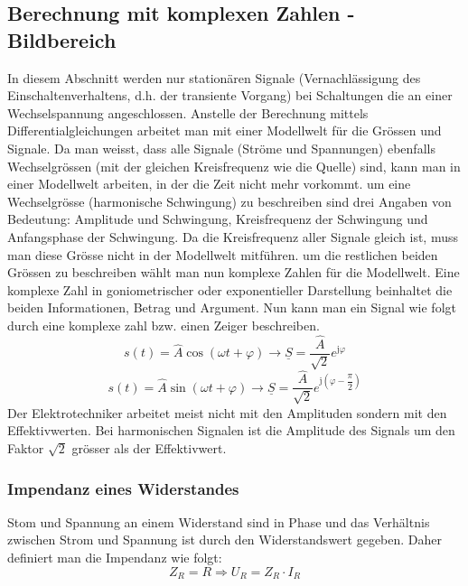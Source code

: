\subsection{Berechnung mit komplexen Zahlen - Bildbereich}
In diesem Abschnitt werden nur stationären Signale (Vernachlässigung des Einschaltenverhaltens, d.h. der transiente Vorgang) bei Schaltungen die an einer Wechselspannung angeschlossen. Anstelle der Berechnung mittels Differentialgleichungen arbeitet man mit einer Modellwelt für die Grössen und Signale. Da man weisst, dass alle Signale (Ströme und Spannungen) ebenfalls Wechselgrössen (mit der gleichen Kreisfrequenz wie die Quelle) sind, kann man in einer Modellwelt arbeiten, in der die Zeit nicht mehr vorkommt. um eine Wechselgrösse (harmonische Schwingung) zu beschreiben sind drei Angaben von Bedeutung: Amplitude und Schwingung, Kreisfrequenz der Schwingung und Anfangsphase der Schwingung.
\newline\newline
Da die Kreisfrequenz aller Signale gleich ist, muss man diese Grösse nicht in der Modellwelt mitführen. um die restlichen beiden Grössen zu beschreiben wählt man nun komplexe Zahlen für die Modellwelt. Eine komplexe Zahl in goniometrischer oder exponentieller Darstellung beinhaltet die beiden Informationen, Betrag und Argument. Nun kann man ein Signal wie folgt durch eine komplexe zahl bzw. einen Zeiger beschreiben.
\begin{equation}
\boxed{s\left(t\right)=\hat{A}\cos\left(\omega t+\varphi\right) \rightarrow \underline{S}=\dfrac{\hat{A}}{\sqrt{2}}e^{\text{j}\varphi}}
\end{equation}
\begin{equation}
\boxed{s\left(t\right)=\hat{A}\sin\left(\omega t+\varphi\right) \rightarrow \underline{S}=\dfrac{\hat{A}}{\sqrt{2}}e^{\text{j}\left(\varphi-\dfrac{\pi}{2}\right)}}
\end{equation}
Der Elektrotechniker arbeitet meist nicht mit den Amplituden sondern mit den Effektivwerten. Bei harmonischen Signalen ist die Amplitude des Signals um den Faktor $\sqrt{2}$ grösser als der Effektivwert.
\subsubsection{Impendanz eines Widerstandes}
Stom und Spannung an einem Widerstand sind in Phase und das Verhältnis zwischen Strom und Spannung ist durch den Widerstandswert gegeben. Daher definiert man die Impendanz wie folgt:
\begin{equation}
\boxed{Z_R=R\Longrightarrow U_R=Z_R\cdot I_R}
\end{equation}
